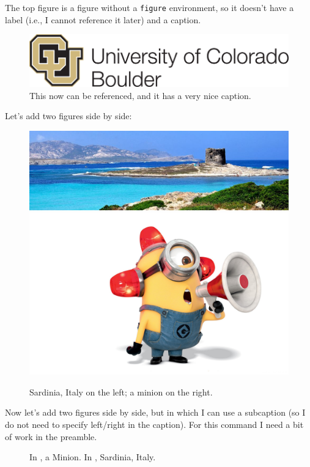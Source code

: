 \documentclass{article}
\begin{document}
The top figure is a figure without a \texttt{figure} environment, so it doesn't have a label (i.e., I cannot reference it later) and a caption.


\begin{figure}[h!]
    \centering
    \includegraphics[width=0.49\linewidth]{Images/CUBoulderLogo.png}
    \caption{This now can be referenced, and it has a very nice caption.}
    \label{fig:CuLogo}
\end{figure}

Let's add two figures side by side:
\begin{figure}[h!]
    \centering
    \includegraphics[width=0.5\linewidth]{Images/Stintino.jpg}
    \hspace{2em} %
    \includegraphics[width=0.4\linewidth]{Images/Minion.jpg}
    \caption{Sardinia, Italy on the left; a minion on the right.}
    \label{fig:SardiniaAndMinion}
\end{figure}

Now let's add two figures side by side, but in which I can use a subcaption (so I do not need to specify left/right in the caption). For this command I need a bit of work in the preamble.

\begin{figure}
    \centering
    \hfill %
    \caption{In \protect{}, a Minion. In \protect{}, Sardinia, Italy.}
\end{figure}

\clearpage


\end{document}
